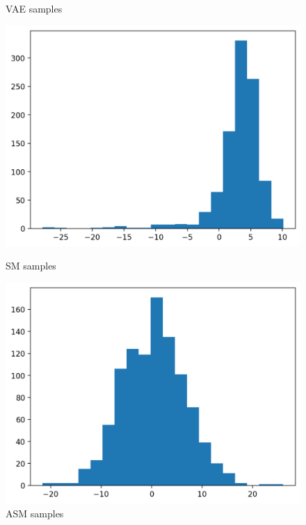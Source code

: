 \documentclass{beamer}
\begin{document}
\begin{frame}
\begin{figure}
\begin{minipage}{0.22\textwidth}
            \caption[]{VAE samples}
        \end{minipage}\hfill
        \begin{minipage}{0.22\textwidth}
            \centering
            \includegraphics[width=1\textwidth]{images/sm_plot.png}
            \caption[]{SM samples}
        \end{minipage}\hfill
        \begin{minipage}{0.22\textwidth}
            \centering
            \includegraphics[width=1\textwidth]{images/anneal_sm.png}
            \caption[]{ASM samples}
        \end{minipage}\hfill
    \end{figure}
\end{frame}
\end{document}
